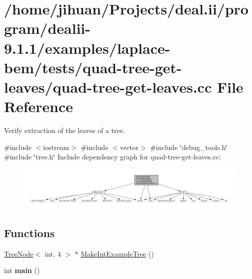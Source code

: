 \hypertarget{quad-tree-get-leaves_8cc}{}\section{/home/jihuan/\+Projects/deal.ii/program/dealii-\/9.1.1/examples/laplace-\/bem/tests/quad-\/tree-\/get-\/leaves/quad-\/tree-\/get-\/leaves.cc File Reference}
\label{quad-tree-get-leaves_8cc}


Verify extraction of the leaves of a tree.  


{\ttfamily \#include $<$iostream$>$}\newline
{\ttfamily \#include $<$vector$>$}\newline
{\ttfamily \#include \char`\"{}debug\+\_\+tools.\+h\char`\"{}}\newline
{\ttfamily \#include \char`\"{}tree.\+h\char`\"{}}\newline
Include dependency graph for quad-\/tree-\/get-\/leaves.cc\+:\nopagebreak
\begin{figure}[H]
\begin{center}
\leavevmode
\includegraphics[width=350pt]{quad-tree-get-leaves_8cc__incl}
\end{center}
\end{figure}
\subsection*{Functions}
\begin{DoxyCompactItemize}
\item 
\hyperlink{classTreeNode}{Tree\+Node}$<$ int, 4 $>$ $\ast$ \hyperlink{quad-tree-get-leaves_8cc_a403caebc7e08d6f14b584539580851d5}{Make\+Int\+Example\+Tree} ()
\item 
\mbox{\label{quad-tree-get-leaves_8cc_ae66f6b31b5ad750f1fe042a706a4e3d4}} 
int {\bfseries main} ()
\end{DoxyCompactItemize}


